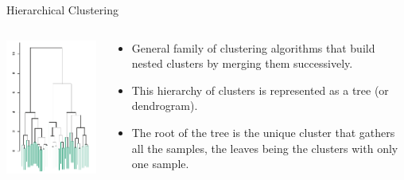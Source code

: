 \documentclass{beamer}
\begin{document}
\begin{frame}{Hierarchical Clustering}

\begin{columns}[T]

\begin{column}{0.33\textwidth}
\includegraphics[scale=0.75]{./figures/hierarchy.png}
\end{column}
\begin{column}{0.66\textwidth}
\begin{itemize}
\item General family of clustering algorithms that {\color{blue}build nested clusters by merging them successively}.\\[2em]

\item This hierarchy of clusters is represented as a tree (or dendrogram).\\[2em]

\item The root of the tree is the unique cluster that gathers all the samples, the leaves being the clusters with only one sample.
\end{itemize}
\end{column}

\end{columns}

\end{frame}


\end{document}
